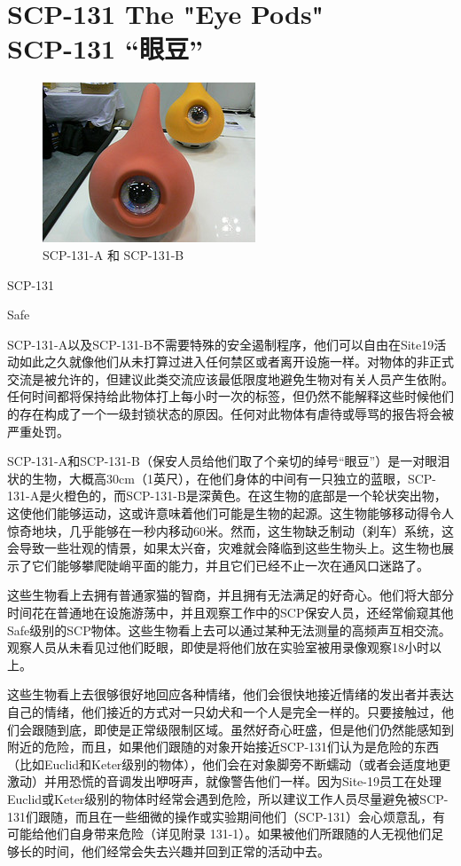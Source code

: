 \chapter[SCP-131 “眼豆”]{
    SCP-131 The "Eye Pods"\\
    SCP-131 “眼豆”
}

\label{chap:SCP-131}

\begin{figure}[H]
    \centering
    \includegraphics[width=0.5\linewidth]{images/SCP.131.jpg}
    \caption*{SCP-131-A 和 SCP-131-B}
\end{figure}

SCP-131

Safe

SCP-131-A以及SCP-131-B不需要特殊的安全遏制程序，他们可以自由在Site19活动如此之久就像他们从未打算过进入任何禁区或者离开设施一样。对物体的非正式交流是被允许的，但建议此类交流应该最低限度地避免生物对有关人员产生依附。任何时间都将保持给此物体打上每小时一次的标签，但仍然不能解释这些时候他们的存在构成了一个一级封锁状态的原因。任何对此物体有虐待或辱骂的报告将会被严重处罚。

SCP-131-A和SCP-131-B（保安人员给他们取了个亲切的绰号“眼豆”）是一对眼泪状的生物，大概高30cm（1英尺），在他们身体的中间有一只独立的蓝眼，SCP-131-A是火橙色的，而SCP-131-B是深黄色。在这生物的底部是一个轮状突出物，这使他们能够运动，这或许意味着他们可能是生物的起源。这生物能够移动得令人惊奇地块，几乎能够在一秒内移动60米。然而，这生物缺乏制动（刹车）系统，这会导致一些壮观的情景，如果太兴奋，灾难就会降临到这些生物头上。这生物也展示了它们能够攀爬陡峭平面的能力，并且它们已经不止一次在通风口迷路了。

这些生物看上去拥有普通家猫的智商，并且拥有无法满足的好奇心。他们将大部分时间花在普通地在设施游荡中，并且观察工作中的SCP保安人员，还经常偷窥其他Safe级别的SCP物体。这些生物看上去可以通过某种无法测量的高频声互相交流。观察人员从未看见过他们眨眼，即使是将他们放在实验室被用录像观察18小时以上。

这些生物看上去很够很好地回应各种情绪，他们会很快地接近情绪的发出者并表达自己的情绪，他们接近的方式对一只幼犬和一个人是完全一样的。只要接触过，他们会跟随到底，即使是正常级限制区域。虽然好奇心旺盛，但是他们仍然能感知到附近的危险，而且，如果他们跟随的对象开始接近SCP-131们认为是危险的东西（比如Euclid和Keter级别的物体），他们会在对象脚旁不断蠕动（或者会适度地更激动）并用恐慌的音调发出咿呀声，就像警告他们一样。因为Site-19员工在处理Euclid或Keter级别的物体时经常会遇到危险，所以建议工作人员尽量避免被SCP-131们跟随，而且在一些细微的操作或实验期间他们（SCP-131）会心烦意乱，有可能给他们自身带来危险（详见附录 131-1）。如果被他们所跟随的人无视他们足够长的时间，他们经常会失去兴趣并回到正常的活动中去。

